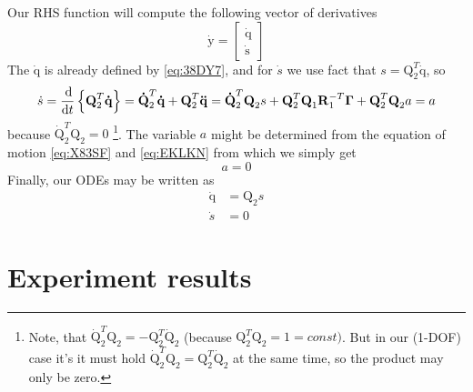 \documentclass{scrartcl}
\newcommand\mMat[1]{\ensuremath{\boldsymbol{\mathrm{#1}}}}
\newcommand\mVec[1]{\ensuremath{\boldsymbol{\mathrm{#1}}}}
\begin{document}
Our RHS function will compute the following vector of derivatives
\begin{equation}
  \mVec{\dot y} = \begin{bmatrix}
    \mVec{\dot q} \\
    \mVec{\dot s}
  \end{bmatrix}
\end{equation}
The $\mVec{\dot q}$ is already defined by \eqref{eq:38DY7}, and for ${\dot s}$
we use fact that $s = \mMat{Q}_2^T \mVec{\dot q}$, so
\begin{equation}
  {\dot s} =  \frac{\dif}{\dif t}\left\{\mMat{Q}_2^T\mVec{\dot q}\right\}
  = \mMat{\dot Q}_2^T \mVec{\dot q}
  + \mMat{Q}_2^T \mVec{\ddot q}
  = \mMat{\dot Q}_2^T \mVec{Q}_2 s
  + \mMat{Q}_2^T \mMat{Q}_1 \mMat{R}_1^{-T} \mVec{\Gamma}
  + \mMat{Q}_2^T \mMat{Q}_2 a
  = a
\end{equation}
because $\mMat{\dot Q}_2^T\mMat{Q}_2 = 0$ \footnote{Note, that
$\mMat{\dot Q}_2^T\mMat{Q}_2 = - \mMat{Q}_2^T \mMat{\dot Q}_2$ (because
$\mMat{Q}_2^T\mMat{Q}_2 = 1 = const)$. But in our (1-DOF) case it's it must
hold $\mMat{\dot Q}_2^T\mMat{Q}_2 = \mMat{Q}_2^T\mMat{\dot Q}_2$ at the same
time, so the product may only be zero.}.
The variable $a$ might be determined from the equation of motion
\eqref{eq:X83SF} and \eqref{eq:EKLKN} from which we simply get
\begin{equation}
  a = 0
\end{equation}
Finally, our ODEs may be written as
\begin{subequations}
  \begin{align}
    \mVec{\dot q} &= \mMat{Q}_2 s
    \\
    {\dot s} &= 0
  \end{align}
\end{subequations}

\section{Experiment results}
\end{document}
